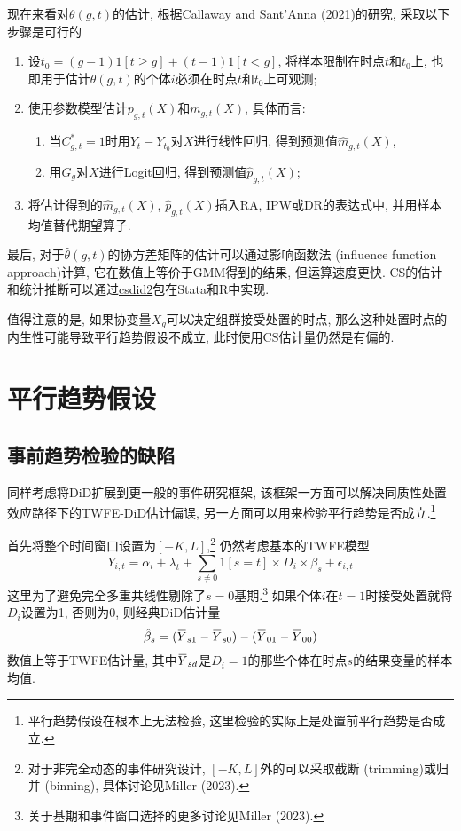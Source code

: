 \documentclass[cn,blue,14pt,screen,bibstyle=gb7714-2015]{elegantnote}
\newcommand{\overbar}[1]{\mkern 1.5mu\overline{\mkern-1.5mu#1\mkern-1.5mu}\mkern 1.5mu}
\begin{document}
现在来看对$\theta(g,t)$的估计, 根据Callaway and Sant'Anna (2021)的研究, 采取以下步骤是可行的
\begin{enumerate}[label=\arabic*.]
  \item 设$t_0=(g-1)1[t\ge g]+(t-1)1[t<g]$, 将样本限制在时点$t$和$t_0$上, 也即用于估计$\theta(g,t)$的个体$i$必须在时点$t$和$t_0$上可观测;
  \item 使用参数模型估计$p_{g,t}(X)$和$m_{g,t}(X)$, 具体而言:
  \begin{enumerate}[label=\alph*.]
    \item 当$C_{g,t}^\ast=1$时用$Y_{t}-Y_{t_0}$对$X$进行线性回归, 得到预测值$\hat{m}_{g,t}(X)$,
    \item 用$G_g$对$X$进行Logit回归, 得到预测值$\hat{p}_{g,t}(X)$;
  \end{enumerate}
  \item 将估计得到的$\hat{m}_{g,t}(X)$, $\hat{p}_{g,t}(X)$插入RA, IPW或DR的表达式中, 并用样本均值替代期望算子.
\end{enumerate}
最后, 对于$\hat{\theta}(g,t)$的协方差矩阵的估计可以通过影响函数法 (influence function approach)计算, 它在数值上等价于GMM得到的结果, 但运算速度更快. CS的估计和统计推断可以通过\href{https://github.com/friosavila/csdid2}{csdid2}包在Stata和R中实现.

值得注意的是, 如果协变量$X_g$可以决定组群接受处置的时点, 那么这种处置时点的内生性可能导致平行趋势假设不成立, 此时使用CS估计量仍然是有偏的.

\newpage
\section{平行趋势假设}
\subsection{事前趋势检验的缺陷}
同样考虑将DiD扩展到更一般的事件研究框架, 该框架一方面可以解决同质性处置效应路径下的TWFE-DiD估计偏误, 另一方面可以用来检验平行趋势是否成立.\footnote{平行趋势假设在根本上无法检验, 这里检验的实际上是处置前平行趋势是否成立.}

首先将整个时间窗口设置为$[-K,L]$,\footnote{对于非完全动态的事件研究设计, $[-K,L]$外的可以采取截断 (trimming)或归并 (binning), 具体讨论见Miller (2023).} 仍然考虑基本的TWFE模型
$$Y_{i,t}=\alpha_i+\lambda_t+\sum_{s\ne0}1[s=t]\times D_i\times\beta_s+\epsilon_{i,t}$$
这里为了避免完全多重共线性剔除了$s=0$基期.\footnote{关于基期和事件窗口选择的更多讨论见Miller (2023).} 如果个体$i$在$t=1$时接受处置就将$D_i$设置为1, 否则为0, 则经典DiD估计量
$$\hat{\beta}_s=(\overbar{Y}_{s1}-\overbar{Y}_{s0})-(\overbar{Y}_{01}-\overbar{Y}_{00})$$
数值上等于TWFE估计量, 其中$\overbar{Y}_{sd}$是$D_i=1$的那些个体在时点$s$的结果变量的样本均值.
\end{document}
